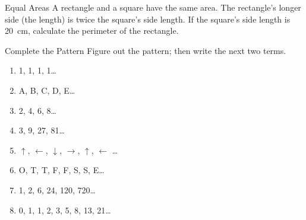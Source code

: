 \documentclass[14pt,letterpaper]{article}
\begin{document}
\begin{problem}{Equal Areas}
 A rectangle and a square have the same area. The rectangle's longer side (the
 length) is twice the square's side length. If the square's side length is
 \SI{20}{\centi\metre}, calculate the perimeter of the rectangle.
\end{problem}

\begin{problem}{Complete the Pattern}
 Figure out the pattern; then write the next two terms.

 \begin{enumerate}[\hspace{1cm}a.]
  \item 1, 1, 1, 1\ldots
  \item A, B, C, D, E\ldots
  \item 2, 4, 6, 8\ldots
  \item 3, 9, 27, 81\ldots
  \item $\uparrow$, $\leftarrow$, $\downarrow$, $\rightarrow$, $\uparrow$,
  $\leftarrow$ \ldots
  \item O, T, T, F, F, S, S, E\ldots
  \item 1, 2, 6, 24, 120, 720\ldots
  \item 0, 1, 1, 2, 3, 5, 8, 13, 21\ldots
 \end{enumerate}
\end{problem}
\end{document}
